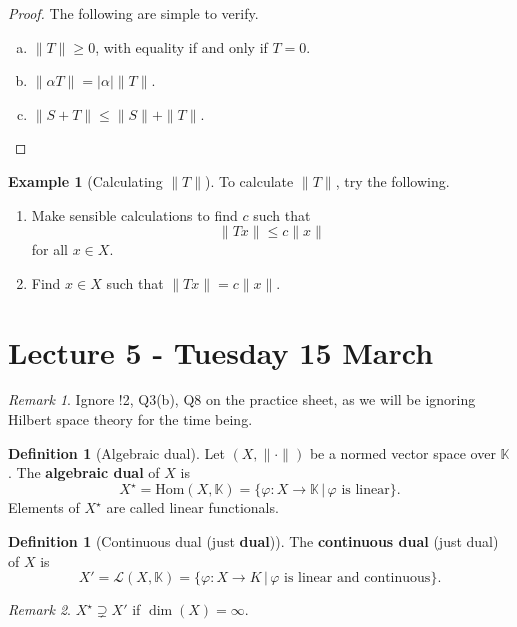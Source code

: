 \documentclass[10pt, reqno, oneside]{amsart}
\theoremstyle{plain}%
\theoremstyle{definition}
\newtheorem{defn}[thm]{Definition}
\newtheorem{exmp}[thm]{Example}
\theoremstyle{remark}
\newtheorem*{rem}{Remark}
\newcommand{\K}{\mathbb{K}}
\renewcommand{\phi}{\varphi}
\begin{document}
\begin{proof}  The following are simple to verify.
	\begin{enumerate}[(a)]
		\item $\| T \| \geq 0$, with equality if and only if $ T = 0$. 
		\item $\| \alpha T \| = | \alpha | \|T \|$.
		\item $\| S + T \| \leq  \| S \| + \| T \|$.
	\end{enumerate}
\end{proof}

\begin{exmp}[Calculating $\| T \|$]
	To calculate $\| T \|$, try the following. 
	\begin{enumerate}[1)]
		\item Make sensible calculations to find $c$ such that \[
			\| Tx \| \leq c \| x \|
		\] for all $x \in X$.
		\item Find $x \in X$ such that $\|Tx \| = c \| x \|$.
	\end{enumerate}
\end{exmp}

\section{Lecture 5 - Tuesday 15 March} %
\label{sec:lecture_5_tusday_15_march}
\begin{rem}
	Ignore !2, Q3(b), Q8 on the practice sheet, as we will be ignoring Hilbert space theory for the time being.
\end{rem}

\begin{defn}[Algebraic dual]
	Let $(X, \| \cdot \|)$ be a normed vector space over $\K$.  The \textbf{algebraic dual} of $X$ is \[
		X^\star = \text{Hom}(X, \K) = \{ \phi: X \rightarrow \K \, | \, \text{$\phi$ is linear} \}.
	\]  Elements of $X^\star$ are called linear functionals.
\end{defn}

\begin{defn}[Continuous dual (just \textbf{dual})]
	The \textbf{continuous dual} (just dual) of $X$ is \[
		X' = \mathcal{L}(X, \K) = \{ \phi : X \rightarrow K \, | \, \text{$\phi$ is linear and continuous} \}.
	\]
\end{defn}

\begin{rem}
	$X^\star \supsetneq X'$ if $\dim(X) = \infty$.
\end{rem}
\end{document}
